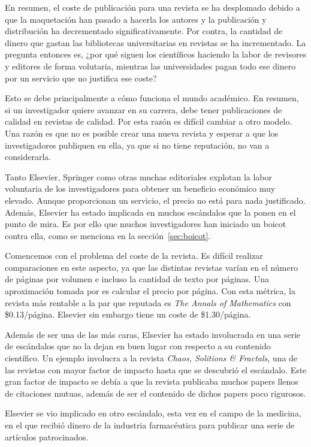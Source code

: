 En resumen, el coste de publicación para una revista se ha desplomado debido a que la maquetación han pasado a hacerla los autores y la publicación y distribución ha decrementado significativamente. Por contra, la cantidad de dinero que gastan las bibliotecas universitarias en revistas se ha incrementado. La pregunta entonces es, ¿por qué siguen los científicos haciendo la labor de revisores y editores de forma volutaria, mientras las universidades pagan todo ese dinero por un servicio que no justifica ese coste?

Esto se debe principalmente a cómo funciona el mundo académico. En resumen, si un investigador quiere avanzar en su carrera, debe tener publicaciones de calidad en revistas de calidad. Por esta razón es difícil cambiar a otro modelo. Una razón es que no es posible crear una nueva revista y esperar a que los investigadores publiquen en ella, ya que si no tiene reputación, no van a considerarla.

Tanto Elsevier, Springer como otras muchas editoriales explotan la labor voluntaria de los investigadores para obtener un beneficio económico muy elevado. Aunque proporcionan un servicio, el precio no está para nada justificado. Además, Elsevier ha estado implicada en muchos escándalos que la ponen en el punto de mira. Es por ello que muchos investigadores han iniciado un boicot contra ella, como se menciona en la sección~\ref{sec:boicot}.

Comencemos con el problema del coste de la revista. Es difícil realizar comparaciones en este aspecto, ya que las distintas revistas varían en el número de páginas por volumen e incluso la cantidad de texto por páginas. Una aproximación tomada por \cite{costknowledge} es calcular el precio por página. Con esta métrica, la revista más rentable a la par que reputada es \textit{The Annals of Mathematics} con \$0.13/página. Elsevier sin embargo tiene un coste de \$1.30/página.

Además de ser una de las más caras, Elsevier ha estado involucrada en una serie de escándalos que no la dejan en buen lugar con respecto a su contenido científico. Un ejemplo involucra a la revista \textit{Chaos, Solitions \& Fractals}, una de las revistas con mayor factor de impacto hasta que se descubrió el escándalo. Este gran factor de impacto se debía a que la revista publicaba muchos papers llenos de citaciones mutuas, además de ser el contenido de dichos papers poco rigurosos.

Elsevier se vio implicado en otro escándalo, esta vez en el campo de la medicina, en el que recibió dinero de la industria farmacéutica para publicar una serie de artículos patrocinados.

